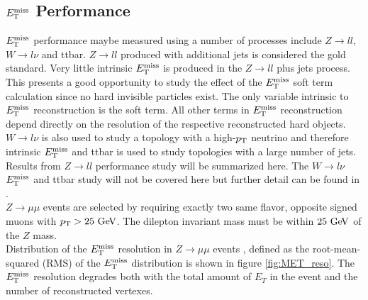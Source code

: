 \subsection{$E_{\mathrm{T}}^{\mathrm{miss}}$ Performance}
\label{sec:reco:METPerform}

\indent $E_{\mathrm{T}}^{\mathrm{miss}}$ performance maybe measured using a number of processes include $Z\rightarrow ll$, $W\rightarrow l\nu$ and ttbar.  $Z\rightarrow ll$ produced with additional jets is considered the gold standard.  Very little intrinsic $E_{\mathrm{T}}^{\mathrm{miss}}$ is produced in the $Z\rightarrow ll$ plus jets process.  This presents a good opportunity to study the effect of the $E_{\mathrm{T}}^{\mathrm{miss}}$ soft term calculation since no hard invisible particles exist.  The only variable intrinsic to $E_{\mathrm{T}}^{\mathrm{miss}}$ reconstruction is the soft term.  All other terms in $E_{\mathrm{T}}^{\mathrm{miss}}$ reconstruction depend directly on the resolution of the respective reconstructed hard objects.  $W\rightarrow l\nu$ is also used to study a topology with a high-$p_{\mathrm{T}}$ neutrino and therefore intrinsic $E_{\mathrm{T}}^{\mathrm{miss}}$ and ttbar is used to study topologies with a large number of jets. \\

\indent Results from $Z\rightarrow ll$ performance study \cite{METReco} will be summarized here.  The $W\rightarrow l\nu$ $E_{\mathrm{T}}^{\mathrm{miss}}$ and ttbar study will not be covered here but further detail can be found in \cite{METReco}. \\

\indent $Z\rightarrow \mu\mu$ events are selected by requiring exactly two same flavor, opposite signed muons with $\pt > 25 \gev$. The dilepton invariant mass must be within $25 \gev$ of the $Z$ mass. \\

\indent Distribution of the $E_{\mathrm{T}}^{\mathrm{miss}}$ resolution in $Z\rightarrow \mu\mu$ events , defined as the root-mean-squared (RMS) of the $E_{\mathrm{T}}^{\mathrm{miss}}$ distribution is shown in figure \ref{fig:MET_reso}.  The $E_{\mathrm{T}}^{\mathrm{miss}}$ resolution degrades both with the total amount of $E_T$ in the event and the number of reconstructed vertexes.\\

